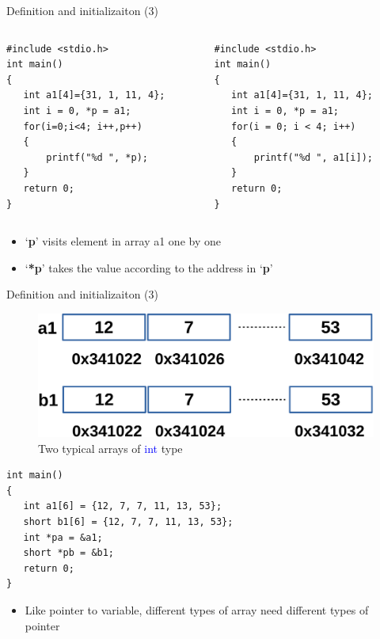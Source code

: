 \begin{frame}[fragile]{Definition and initializaiton (3)}
\vspace{-0.15in}
\begin{columns}
\begin{column}{0.46\linewidth}
\begin{lstlisting}
#include <stdio.h>
int main()
{
   int a1[4]={31, 1, 11, 4};
   int i = 0, *p = a1;
   for(i=0;i<4; i++,p++)
   {
       printf("%d ", *p);
   }
   return 0;
}
\end{lstlisting}
\end{column}
\begin{column}{0.46\linewidth}
\begin{lstlisting}
#include <stdio.h>
int main()
{
   int a1[4]={31, 1, 11, 4};
   int i = 0, *p = a1;
   for(i = 0; i < 4; i++)
   {
       printf("%d ", a1[i]);
   }
   return 0;
}
\end{lstlisting}
\end{column}
\end{columns}
\begin{itemize}
	\item {`\textbf{p}' visits element in array a1 one by one}
	\item {`\textbf{*p}' takes the value according to the address in `\textbf{p}'}
\end{itemize}
\end{frame}

\begin{frame}[fragile]{Definition and initializaiton (3)}
\begin{figure}
	\includegraphics[width=0.50\linewidth]{figs/array1.pdf}
	\caption{Two typical arrays of \textcolor{blue}{int} type}
\end{figure}
\vspace{-0.25in}
\begin{lstlisting}[xleftmargin=0.08\linewidth, linewidth=0.9\linewidth]
int main()
{
   int a1[6] = {12, 7, 7, 11, 13, 53};
   short b1[6] = {12, 7, 7, 11, 13, 53};
   int *pa = &a1;
   short *pb = &b1;
   return 0;
}
\end{lstlisting}
\begin{itemize}
	\item {Like pointer to variable, different types of array need different types of pointer}
\end{itemize}
\end{frame}

